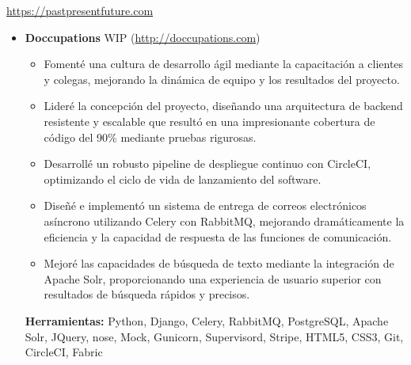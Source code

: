\documentclass[11pt,a4paper,english]{moderncv}
\begin{document}
{
    \url{https://pastpresentfuture.com}
\newline{}
\begin{itemize}
    \item \textbf{Doccupations}
        \newline{}
        WIP (\url{http://doccupations.com})
        \begin{itemize}
            \item Fomenté una cultura de desarrollo ágil mediante la capacitación a clientes y colegas, mejorando la dinámica de equipo y los resultados del proyecto.
            \item Lideré la concepción del proyecto, diseñando una arquitectura de backend resistente y escalable que resultó en una impresionante cobertura de código del 90\% mediante pruebas rigurosas.
            \item Desarrollé un robusto pipeline de despliegue continuo con CircleCI, optimizando el ciclo de vida de lanzamiento del software.
            \item Diseñé e implementó un sistema de entrega de correos electrónicos asíncrono utilizando Celery con RabbitMQ, mejorando dramáticamente la eficiencia y la capacidad de respuesta de las funciones de comunicación.
            \item Mejoré las capacidades de búsqueda de texto mediante la integración de Apache Solr, proporcionando una experiencia de usuario superior con resultados de búsqueda rápidos y precisos.
        \end{itemize}
        \textbf{Herramientas:} Python, Django, Celery, RabbitMQ, PostgreSQL, Apache Solr, JQuery, nose, Mock, Gunicorn, Supervisord, Stripe, HTML5, CSS3, Git, CircleCI, Fabric
\end{itemize}
}

\subsection{}
\end{document}
